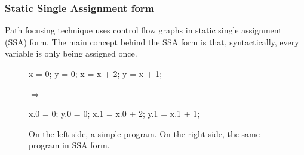 \documentclass[a4paper,english,titlepage,11pt]{article}
\begin{document}
%
%
%
%
%
%
	
	\subsubsection{Static Single Assignment form}

	Path focusing technique uses control flow graphs in static single assignment
	(SSA) form. The main concept behind the SSA form is that, syntactically,
	every variable is	
	only being assigned once. 


\begin{figure}[!h]
\centering
\begin{minipage}[c]{.39\linewidth}
\begin{C}
x = 0;
y = 0;
x = x + 2;
y = x + 1;
\end{C}
\end{minipage} 
$\Longrightarrow$ \hfill
\begin{minipage}[c]{.49\linewidth}
\begin{C}
x.0 = 0;
y.0 = 0;
x.1 = x.0 + 2;
y.1 = x.1 + 1;
\end{C}
\end{minipage}
\caption{On the left side, a simple program. On the right side, the same
program in SSA form.}
\end{figure}
\end{document}
